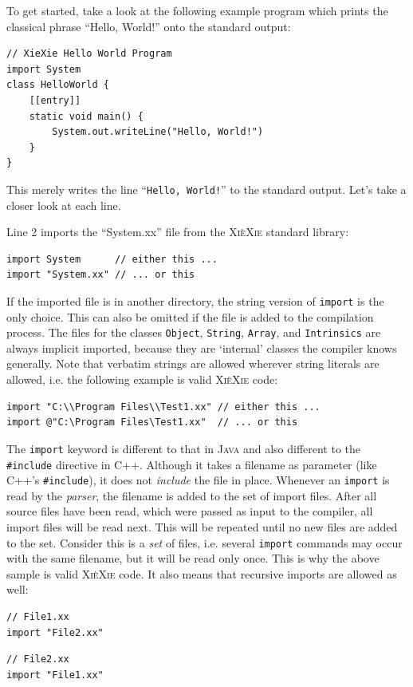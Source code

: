 \documentclass{report}
\def\xiexie{\textsc{Xi\`eXie}\xspace}
\def\cpp{\textsc{C++}\xspace}
\def\java{\textsc{Java}\xspace}
\begin{document}
To get started, take a look at the following example program which prints the classical phrase ``Hello, World!''
onto the standard output:
\begin{lstlisting}
// XieXie Hello World Program
import System
class HelloWorld {
    [[entry]]
    static void main() {
        System.out.writeLine("Hello, World!")
    }
}
\end{lstlisting}
This merely writes the line ``\texttt{Hello, World!}'' to the standard output. Let's take a closer look at each line.

Line 2 imports the ``System.xx'' file from the \xiexie standard library:
\begin{lstlisting}
import System      // either this ...
import "System.xx" // ... or this
\end{lstlisting}
If the imported file is in another directory, the string version of \texttt{import} is the only choice.
This can also be omitted if the file is added to the compilation process.
The files for the classes \texttt{Object}, \texttt{String}, \texttt{Array}, and \texttt{Intrinsics}
are always implicit imported, because they are `internal' classes the compiler knows generally.
Note that verbatim strings are allowed wherever string literals are allowed, i.e. the following example is valid \xiexie code:
\begin{lstlisting}
import "C:\\Program Files\\Test1.xx" // either this ...
import @"C:\Program Files\Test1.xx"  // ... or this
\end{lstlisting}
The \texttt{import} keyword is different to that in \java and also different to the \texttt{\#include} directive in \cpp.
Although it takes a filename as parameter (like \cpp's \texttt{\#include}), it does not \textit{include} the file in place.
Whenever an \texttt{import} is read by the \textit{parser}, the filename is added to the set of import files.
After all source files have been read, which were passed as input to the compiler, all import files will be read next.
This will be repeated until no new files are added to the set.
Consider this is a \textit{set} of files, i.e. several \texttt{import} commands may occur with the same filename,
but it will be read only once. This is why the above sample is valid \xiexie code. It also means that recursive imports
are allowed as well:
\begin{lstlisting}
// File1.xx
import "File2.xx"
\end{lstlisting}
\begin{lstlisting}
// File2.xx
import "File1.xx"
\end{lstlisting}
\end{document}

